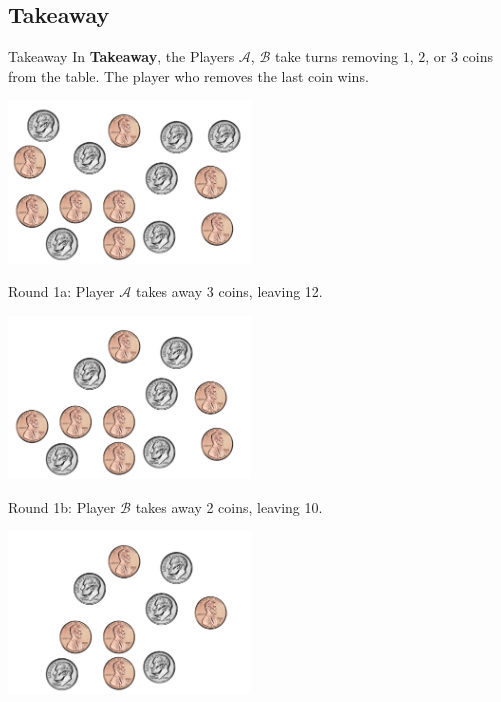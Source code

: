 \documentclass{beamer}
\theoremstyle{theorem}
\theoremstyle{definition}
\newcommand{\<}{\langle}
\renewcommand{\>}{\rangle}
\newcommand{\pl}[1]{\mathscr{#1}}
\newcommand{\term}[1]{\textbf{#1}}
\begin{document}
\subsection{Takeaway}

\begin{frame}{Takeaway}
  In \term{Takeaway}, the Players $\pl A$, $\pl B$ take turns removing $1$,
  $2$, or $3$ coins from the table. The player who
  removes the last coin wins.

  \vspace{1em}

  \centerline{
    \includegraphics[height=1.7in]{takeawayCoins/15.pdf}
  }
\end{frame}

\begin{frame}
  Round 1a: Player $\pl A$ takes away 3 coins, leaving 12.

  \centerline{
    \includegraphics[height=1.7in]{takeawayCoins/12.pdf}
  }
\end{frame}

\begin{frame}
  Round 1b: Player $\pl B$ takes away 2 coins, leaving 10.

  \centerline{
    \includegraphics[height=1.7in]{takeawayCoins/10.pdf}
  }
\end{frame}
\end{document}
